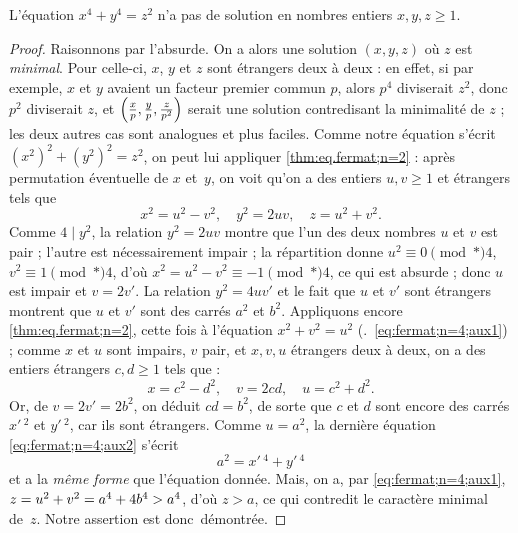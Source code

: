 \documentclass[11pt, %
  title in boldface,
  theorem in new line,
  theorem numbering = section,
  number theorems separately,
  simple name,
]{beaulivre}
\begin{document}
    \begin{theorem}\label{thm:eq.fermat;n=4}
        L'équation \( x^4+y^4=z^2 \) n'a pas de solution en nombres entiers \( x,y,z \geqslant 1 \).
    \end{theorem}
    \begin{proof}
        Raisonnons par l'absurde. On a alors une solution \( (x,y,z) \) où \( z \) est \emph{minimal}. Pour celle-ci, \( x \), \( y \) et \( z \) sont étrangers deux à deux : en effet, si par exemple, \( x \) et \( y \) avaient un facteur premier commun \( p \), alors \( p^4 \) diviserait \( z^2 \), donc \( p^2 \) diviserait \( z \), et \( \Bigl(\frac{x\vphantom{y}}{p}, \frac{y}{p}, \frac{z\vphantom{y}}{p^2}\Bigr) \) serait une solution contredisant la minimalité de \( z \) ; les deux autres cas sont analogues et plus faciles. Comme notre équation s'écrit \( (x^2)^2+(y^2)^2 = z^2 \), on peut lui appliquer \cref{thm:eq.fermat;n=2} : après permutation éventuelle de \( x \) et~\( y \), on voit qu'on a des entiers \( u,v \geqslant 1 \) et étrangers tels que
        \begin{equation}\label{eq:fermat;n=4;aux1}
            x^2 = u^2-v^2, \quad
            y^2 = 2uv, \quad
            z = u^2+v^2.
        \end{equation}
        Comme \( 4 \mid y^2 \), la relation \( y^2 = 2uv \) montre que l'un des deux nombres \( u \) et \( v \) est pair ; l'autre est nécessairement impair ; la répartition  donne \( u^2 \equiv 0 \pmod*{4} \), \( v^2 \equiv 1 \pmod*{4} \), d'où \( x^2 = u^2-v^2 \equiv -1 \pmod*{4} \), ce qui est absurde ; donc \( u \) est impair et \( v = 2v' \). La relation \( y^2 = 4uv' \) et le fait que \( u \) et \( v' \) sont étrangers montrent que \( u \) et \( v' \) sont des carrés \( a^2 \) et \( b^2 \). Appliquons encore \cref{thm:eq.fermat;n=2}, cette fois à l'équation \( x^2+v^2=u^2 \) (\cf.~\eqref{eq:fermat;n=4;aux1}) ; comme \( x \) et \( u \) sont impairs, \( v \) pair, et \( x,v,u \) étrangers deux à deux, on a des entiers étrangers \( c, d \geqslant 1 \) tels que :
        \begin{equation}\label{eq:fermat;n=4;aux2}
            x = c^2-d^2, \quad
            v = 2cd, \quad
            u = c^2+d^2.
        \end{equation}
        Or, de \( v = 2v' = 2b^2 \), on déduit \( cd = b^2 \), de sorte que \( c \) et \( d \) sont encore des carrés \( x'\,^2 \) et \( y'\,^2 \), car ils sont étrangers. Comme \( u = a^2 \), la dernière équation \eqref{eq:fermat;n=4;aux2} s'écrit
        \begin{equation}
            a^2 = x'\,^4 + y'\,^4
        \end{equation}
        et a la \emph{même forme} que l'équation donnée. Mais, on a, par \eqref{eq:fermat;n=4;aux1}, \( z = u^2 + v^2 = a^4+4b^4 >\nobreak a^4 \), d'où \( z > a \), ce qui contredit le caractère minimal de~\( z \). Notre assertion est donc~démontrée.
    \end{proof}
\end{document}
